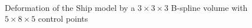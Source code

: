 \documentclass[3p]{elsarticle}
\begin{document}
\begin{figure}[htbp]
\begin{center}
	\begin{minipage}[l]{0.54\textwidth}
		\centering
		\caption{Deformation of the Ship model by a $3\times3\times3$ B-spline volume with $5\times8\times5$ control points}
		\label{fig:ship}
	\end{minipage}
~
	\begin{minipage}[r]{0.44\textwidth}
		\centering

\end{minipage}
\end{center}
\end{figure}
\end{document}

